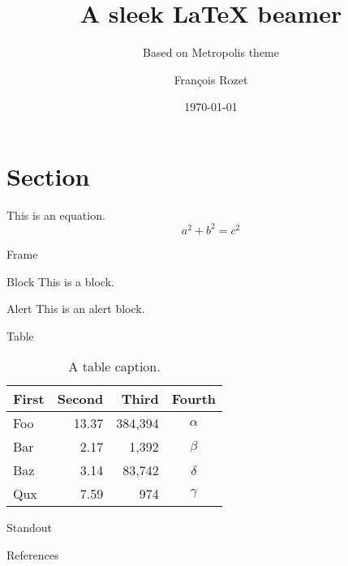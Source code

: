 \documentclass[12pt]{beamer}
\title{A sleek \LaTeX{} beamer}
\subtitle{Based on Metropolis theme}
\author{François Rozet}
\institute{University of Liège}
\date{\today}
\begin{document}
\maketitle

\section{Section}

\begin{frame}
    This is an equation. $$ a^2 + b^2 = c^2 $$
\end{frame}

\begin{frame}{Frame}
    \begin{block}{Block}
        This is a block.
    \end{block}

    \begin{alertblock}{Alert}
        This is an \alert{alert} block.
    \end{alertblock}

\end{frame}

\begin{frame}{Table}
    \begin{table}
        \centering
        \begin{tabular}{lrrc}
            \toprule
            \textbf{First} & \textbf{Second} & \textbf{Third} & \textbf{Fourth} \\
            \midrule
            Foo & 13.37 & 384,394 & $\alpha$ \\
            Bar & 2.17 & 1,392 & $\beta$ \\
            Baz & 3.14 & 83,742 & $\delta$ \\
            Qux & 7.59 & 974 & $\gamma$ \\
            \bottomrule
        \end{tabular}
        \caption{A table caption.}
    \end{table}
\end{frame}

\begin{frame}[standout]
    Standout
\end{frame}

\begin{frame}[allowframebreaks]{References}
    \nocite{einstein}
    \nocite{knuthwebsite}
    \nocite{dirac}
    \printbibliography[heading=none]
\end{frame}
\end{document}
